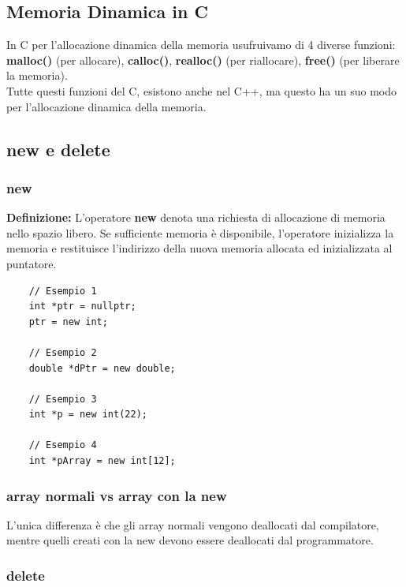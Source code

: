 \subsection{Memoria Dinamica in C}

\textsf{\small In C per l'allocazione dinamica della memoria usufruivamo di 4 diverse funzioni: \textbf{malloc()} (per allocare), \textbf{calloc()}, \textbf{realloc()} (per riallocare), \textbf{free()} (per liberare la memoria).} \\

\textsf{\small Tutte questi funzioni del C, esistono anche nel C++, ma questo ha un suo modo per l'allocazione dinamica della memoria.} \break

\subsection{new e delete}

\subsubsection{new}

\textsf{\small \textbf{Definizione: } L'operatore \textbf{new} denota una richiesta di allocazione di memoria nello spazio libero. Se sufficiente memoria è disponibile, l'operatore inizializza la memoria e restituisce l'indirizzo della nuova memoria allocata ed inizializzata al puntatore.} \\

\begin{lstlisting}
	// Esempio 1
	int *ptr = nullptr;
	ptr = new int;
	
	// Esempio 2
	double *dPtr = new double;
	
	// Esempio 3
	int *p = new int(22);
	
	// Esempio 4
	int *pArray = new int[12];
\end{lstlisting}

\subsubsection{array normali vs array con la new}

\textsf{\small L'unica differenza è che gli array normali vengono deallocati dal compilatore, mentre quelli creati con la new devono essere deallocati dal programmatore.} \break

\subsubsection{delete}

